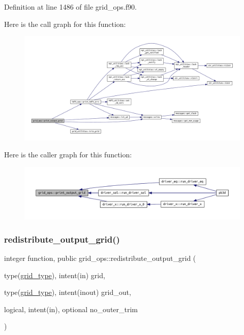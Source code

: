 Definition at line 1486 of file grid\+\_\+ops.\+f90.

Here is the call graph for this function\+:\nopagebreak
\begin{figure}[H]
\begin{center}
\leavevmode
\includegraphics[width=350pt]{namespacegrid__ops_a4827e794d37334c0cad9bb2016e64d46_cgraph}
\end{center}
\end{figure}
Here is the caller graph for this function\+:\nopagebreak
\begin{figure}[H]
\begin{center}
\leavevmode
\includegraphics[width=350pt]{namespacegrid__ops_a4827e794d37334c0cad9bb2016e64d46_icgraph}
\end{center}
\end{figure}
\mbox{\label{namespacegrid__ops_ab10ef5b486ee3861df2da4e53bc22630}} 
\subsubsection{\texorpdfstring{redistribute\+\_\+output\+\_\+grid()}{redistribute\_output\_grid()}}
{\footnotesize\ttfamily integer function, public grid\+\_\+ops\+::redistribute\+\_\+output\+\_\+grid (\begin{DoxyParamCaption}\item[{type(\hyperlink{structgrid__vars_1_1grid__type}{grid\+\_\+type}), intent(in)}]{grid,  }\item[{type(\hyperlink{structgrid__vars_1_1grid__type}{grid\+\_\+type}), intent(inout)}]{grid\+\_\+out,  }\item[{logical, intent(in), optional}]{no\+\_\+outer\+\_\+trim }\end{DoxyParamCaption})}



